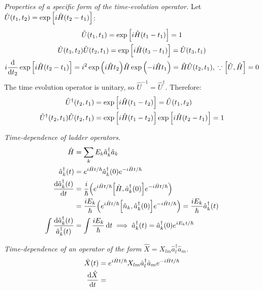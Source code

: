 \documentclass{report}
\begin{document}
\begin{subquests}
	\item \emph{Properties of a specific form of the time-evolution operator.} Let $\hat{U}(t_1,t_2) = \exp\bqty{i\hat{H}(t_2 - t_1)}$:
	\begin{gather*}
		\hat{U}(t_1,t_1) = \exp\bqty{i\hat{H}(t_1 - t_1)} = 1 \\
		\hat{U}(t_3,t_2)\hat{U}(t_2, t_1) = \exp\bqty{i\hat{H}(t_3 - t_1)} = \hat{U}(t_3,t_1) \\
		i\dv{t_2}\exp\bqty{i\hat{H}(t_2 - t_1)} = i^2\exp\pqty{i\hat{H}t_2}\hat{H}\exp\pqty{-i\hat{H}t_1} = \hat{H}\hat{U}(t_2, t_1),\;\because \bqty{\hat U, \hat H} = 0 \\
	\end{gather*}
	The time evolution operator is unitary, so $\hat{U}^{-1} = \hat{U}^{\dagger}$. Therefore:
	\begin{align*}
		\hat{U}^{\dagger}(t_2, t_1) & = \exp\bqty{i\hat{H}(t_1 - t_2)} = \hat{U}(t_1,t_2) \\
		\hat{U}^{\dagger}(t_2, t_1)\hat{U}(t_2,t_1) & = \exp\bqty{i\hat{H}(t_1 - t_2)}\exp\bqty{i\hat{H}(t_2 - t_1)} = 1
	\end{align*}

	\item \emph{Time-dependence of ladder operators.}
	\begin{align*}
		\hat{H} & = \sum_k E_k \hat{a}_k^\dagger \hat{a}_k \\
		\hat{a}^{\dagger}_{k}(t) & = e^{i\hat{H}t/\hbar}\hat{a}^{\dagger}_{k}(0)e^{-i\hat{H}t/\hbar} \\
		\dv{\hat{a}^{\dagger}_{k}(t)}{t} & = \frac{i}{\hbar}\pqty{e^{i\hat{H}t/\hbar}\bqty{\hat{H},\hat{a}^{\dagger}_{k}(0)}e^{-i\hat{H}t/\hbar}} \\
		& = \frac{iE_k}{\hbar}\pqty{e^{i\hat{H}t/\hbar}\bqty{\hat{n}_k,\hat{a}^{\dagger}_{k}(0)}e^{-i\hat{H}t/\hbar}} = \frac{iE_k}{\hbar}\hat{a}^{\dagger}_{k}(t) \\
		\int \frac{\dd{\hat{a}^{\dagger}_{k}(t)}}{\hat{a}^{\dagger}_{k}(t)} & 	= \int \frac{iE_k}{\hbar}\dd{t} \implies \hat{a}^{\dagger}_{k}(t) = \hat{a}^{\dagger}_{k}(0)e^{iE_kt/\hbar}
	\end{align*}

	\item \emph{Time-dependence of an operator of the form $\hat X = X_{lm} \hat{a}^{\dagger}_l \hat{a}_m$.}
	\begin{align*}
		\hat{X}(t) & = e^{i\hat{H}t/\hbar}X_{lm}\hat{a}^{\dagger}_l \hat{a}_m e^{-i\hat{H}t/\hbar} \\
		\dv{\hat{X}}{t} & = 
	\end{align*}


\end{subquests}
\end{document}
